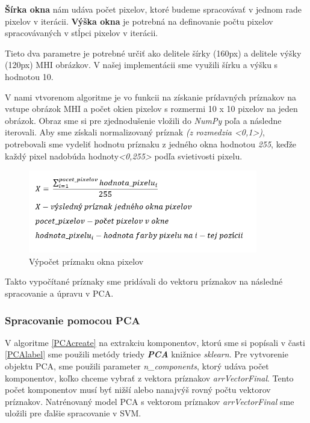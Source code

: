 \textbf{Šírka okna} nám udáva počet pixelov, ktoré budeme spracovávať v jednom rade pixelov v iterácii.
\textbf{Výška okna} je potrebná na definovanie počtu pixelov spracovávaných v stĺpci pixelov v iterácii.

Tieto dva parametre je potrebné určiť ako delitele šírky (160px) a delitele výšky (120px) MHI obrázkov. V našej implementácii sme využili šírku a výšku s hodnotou 10.



V nami vtvorenom algoritme je vo funkcii na získanie prídavných príznakov na vstupe obrázok MHI a počet okien pixelov s rozmermi 10 x 10 pixelov na jeden obrázok. Obraz sme si pre zjednodušenie vložili do \textit{NumPy} poľa a následne iterovali. Aby sme získali normalizovaný príznak \textit{(z rozmedzia <0,1>)}, potrebovali sme vydeliť hodnotu príznaku z jedného okna hodnotou \textit{255}, keďže každý pixel nadobúda hodnoty\textit{<0,255>} podľa svietivosti pixelu.

\begin{figure}[H]
  \centering
  \includegraphics[width=10cm]{img/AddFeat.png}
  \caption{Výpočet príznaku okna pixelov}
  \label{MHIbox}
\end{figure}   

Takto vypočítané príznaky sme pridávali do vektoru príznakov na následné spracovanie a úpravu v PCA.

\subsubsection{Spracovanie pomocou PCA} \label{PCAim}
V algoritme \ref{PCAcreate} na extrakciu komponentov, ktorú sme si popísali v časti \ref{PCAlabel} sme použili metódy triedy \textit{\textbf{PCA}} knižnice \textit{sklearn}. Pre vytvorenie objektu PCA, sme použili parameter \textit{n\_components}, ktorý udáva počet komponentov, koľko chceme vybrať z vektora príznakov \textit{arrVectorFinal}. Tento počet komponentov musí byť nižší alebo nanajvýš rovný počtu vektorov príznakov. Natrénovaný model PCA s vektorom príznakov \textit{arrVectorFinal} sme uložili pre ďalšie spracovanie v SVM.

